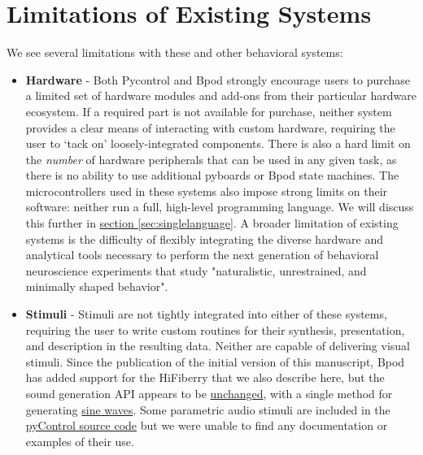 
\section{Limitations of Existing Systems}
\label{sec:limitations}

We see several limitations with these and other behavioral systems:

\begin{itemize}[after=\vspace{-\topsep}]
    \item \textbf{Hardware} - Both Pycontrol and Bpod strongly encourage users to purchase a limited set of hardware modules and add-ons from their particular hardware ecosystem. If a required part is not available for purchase, neither system provides a clear means of interacting with custom hardware, requiring the user to `tack on' loosely-integrated components. There is also a hard limit on the \textit{number} of hardware peripherals that can be used in any given task, as there is no ability to use additional pyboards or Bpod state machines. The microcontrollers used in these systems also impose strong limits on their software: neither run a full, high-level programming language. We will discuss this further in \hyperref[sec:singlelanguage]{section \ref*{sec:singlelanguage}}. A broader  limitation of existing systems is the difficulty of flexibly integrating the diverse hardware and analytical tools necessary to perform the next generation of behavioral neuroscience experiments that study "naturalistic, unrestrained, and minimally shaped behavior"\citep{dattaComputationalNeuroethologyCall2019}.
    \item \textbf{Stimuli} - Stimuli are not tightly integrated into either of these systems, requiring the user to write custom routines for their synthesis, presentation, and description in the resulting data. Neither are capable of delivering visual stimuli. Since the publication of the initial version of this manuscript, Bpod has added support for the HiFiberry that we also describe here\citep{sanworksllc.ReasonsUseBpod2021}, but the sound generation API appears to be \href{https://github.com/sanworks/Bpod_Gen2/blob/df6cd0c7d5df8247b02077b05fc263f79b86b096/Examples/Protocols/Sound/HiFiSound2AFC_TrialManager/HiFiSound2AFC_TrialManager.m}{unchanged}, with a single method for generating \href{https://github.com/sanworks/Bpod_Gen2/blob/1cb181dffbb7394acd18819f1d268fd9dec6ec5b/Functions/Internal%20Functions/GenerateSineWave.m}{sine waves}. Some parametric audio stimuli are included in the \href{https://bitbucket.org/takam/pycontrol/src/default/pyControl/audio.py}{pyControl source code} but we were unable to find any documentation or examples of their use. %
\end{itemize}\nobreak%
